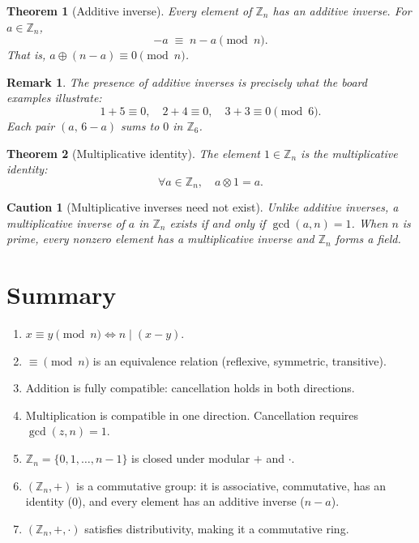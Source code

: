 \documentclass[11pt]{article}
\theoremstyle{defstyle}
\theoremstyle{thmstyle}
\newtheorem{theorem}{Theorem}[section]
\theoremstyle{notstyle}
\newtheorem*{remark}{Remark}
\theoremstyle{cautionstyle}
\newtheorem*{caution}{Caution}
\begin{document}
\begin{thmbox}
\begin{theorem}[Additive inverse]
Every element of $\mathbb{Z}_n$ has an additive inverse.  For $a \in \mathbb{Z}_n$,
\[
  -a \;\equiv\; n - a \pmod{n}.
\]
That is, $a \oplus (n-a) \equiv 0 \pmod{n}$.
\end{theorem}
\end{thmbox}

\begin{notebox}
\begin{remark}
The presence of additive inverses is precisely what the board examples illustrate:
\[
  1+5\equiv 0,\quad 2+4\equiv 0,\quad 3+3\equiv 0 \pmod{6}.
\]
Each pair $(a,\, 6-a)$ sums to $0$ in $\mathbb{Z}_6$.
\end{remark}
\end{notebox}

\begin{thmbox}
\begin{theorem}[Multiplicative identity]
The element $1 \in \mathbb{Z}_n$ is the multiplicative identity:
\[
  \forall a \in \mathbb{Z}_n, \quad a \otimes 1 = a.
\]
\end{theorem}
\end{thmbox}

\begin{cautionbox}
\begin{caution}[Multiplicative inverses need not exist]
Unlike additive inverses, a multiplicative inverse of $a$ in $\mathbb{Z}_n$ exists if and only if $\gcd(a,n) = 1$.  When $n$ is prime, every nonzero element has a multiplicative inverse and $\mathbb{Z}_n$ forms a \emph{field}.
\end{caution}
\end{cautionbox}

\section{Summary}

\begin{enumerate}[leftmargin=*, label=\arabic*.]
  \item $x \equiv y \pmod{n} \iff n \mid (x-y)$.
  \item $\equiv \pmod{n}$ is an equivalence relation (reflexive, symmetric, transitive).
  \item Addition is fully compatible: cancellation holds in both directions.
  \item Multiplication is compatible in one direction.  Cancellation requires $\gcd(z,n)=1$.
  \item $\mathbb{Z}_n = \{0,1,\ldots,n-1\}$ is closed under modular $+$ and $\cdot$.
  \item $(\mathbb{Z}_n, +)$ is a commutative group: it is associative, commutative, has an identity ($0$), and every element has an additive inverse ($n-a$).
  \item $(\mathbb{Z}_n, +, \cdot)$ satisfies distributivity, making it a commutative ring.
\end{enumerate}
\end{document}
